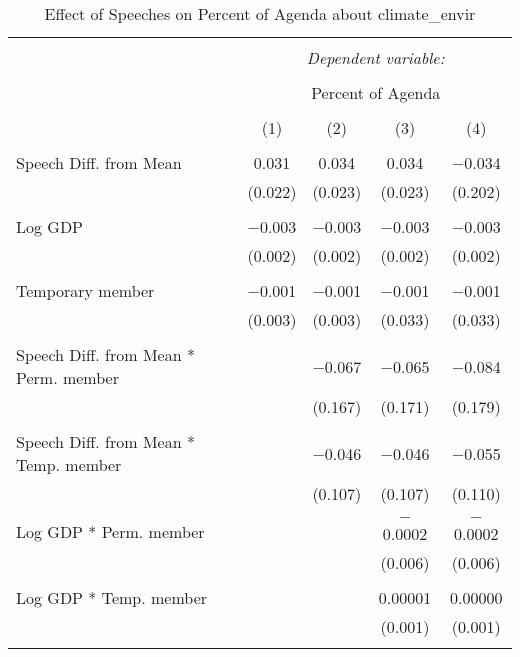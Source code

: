 
\begin{table}[!htbp] \centering 
  \caption{Effect of Speeches on Percent of Agenda about climate_envir} 
  \label{} 
\begin{tabular}{@{\extracolsep{5pt}}lcccc} 
\\[-1.8ex]\hline 
\hline \\[-1.8ex] 
 & \multicolumn{4}{c}{\textit{Dependent variable:}} \\ 
\cline{2-5} 
\\[-1.8ex] & \multicolumn{4}{c}{Percent of Agenda} \\ 
\\[-1.8ex] & (1) & (2) & (3) & (4)\\ 
\hline \\[-1.8ex] 
 Speech Diff. from Mean & 0.031 & 0.034 & 0.034 & $-$0.034 \\ 
  & (0.022) & (0.023) & (0.023) & (0.202) \\ 
  & & & & \\ 
 Log GDP & $-$0.003 & $-$0.003 & $-$0.003 & $-$0.003 \\ 
  & (0.002) & (0.002) & (0.002) & (0.002) \\ 
  & & & & \\ 
 Temporary member & $-$0.001 & $-$0.001 & $-$0.001 & $-$0.001 \\ 
  & (0.003) & (0.003) & (0.033) & (0.033) \\ 
  & & & & \\ 
 Speech Diff. from Mean * Perm. member &  & $-$0.067 & $-$0.065 & $-$0.084 \\ 
  &  & (0.167) & (0.171) & (0.179) \\ 
  & & & & \\ 
 Speech Diff. from Mean * Temp. member &  & $-$0.046 & $-$0.046 & $-$0.055 \\ 
  &  & (0.107) & (0.107) & (0.110) \\ 
  & & & & \\ 
 Log GDP * Perm. member &  &  & $-$0.0002 & $-$0.0002 \\ 
  &  &  & (0.006) & (0.006) \\ 
  & & & & \\ 
 Log GDP * Temp. member &  &  & 0.00001 & 0.00000 \\ 
  &  &  & (0.001) & (0.001) \\ 
  & & & & \\ 

\end{tabular}
\end{table}
